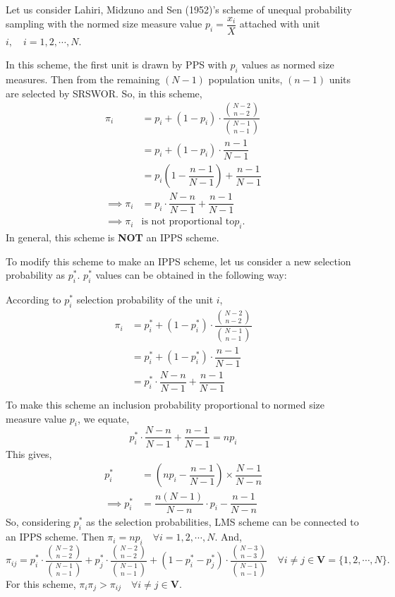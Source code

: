 \documentclass[12pt]{article}
\theoremstyle{definition}
\begin{document}
Let us consider Lahiri, Midzuno and Sen (1952)'s scheme of unequal probability sampling with the normed size measure value $p_i=\dfrac{x_i}{X}$ attached with unit $i, \quad i=1,2,\cdots ,N$.

In this scheme, the first unit is drawn by PPS with $p_i$ values as normed size measures. Then from the remaining $(N-1)$ population units, $(n-1)$ units are selected by SRSWOR. So, in this scheme,
\begin{align*}
    \pi_i & = p_i +(1-p_i)\cdot \dfrac{{N-2 \choose n-2}}{{N-1 \choose n-1}}\\
    & = p_i + (1-p_i)\cdot \dfrac{n-1}{N-1}\\
    & = p_i \left(1-\dfrac{n-1}{N-1}\right)+\dfrac{n-1}{N-1}\\
    \implies \pi_i & = p_i\cdot\dfrac{N-n}{N-1}+\dfrac{n-1}{N-1}\\
    \implies \pi_i & \text{is not proportional to} p_i.
\end{align*}
In general, this scheme is \textbf{NOT} an IPPS scheme.

To modify this scheme to make an IPPS scheme, let us consider a new selection probability as $p_i^*$. $p_i^*$ values can be obtained in the following way:

According to $p_i^*$ selection probability of the unit $i$, 
\begin{align*}
    \pi_i & = p_i^* +(1-p_i^*)\cdot \dfrac{{N-2 \choose n-2}}{{N-1 \choose n-1}}\\
    & = p_i^* + (1-p_i^*)\cdot \dfrac{n-1}{N-1}\\
    & = p_i^*\cdot\dfrac{N-n}{N-1}+\dfrac{n-1}{N-1}\\
\end{align*}
To make this scheme an inclusion probability proportional to normed size measure value $p_i$, we equate,
$$p_i^*\cdot\dfrac{N-n}{N-1}+\dfrac{n-1}{N-1}=np_i$$
This gives,
\begin{align*}
    p_i^* & = \left(np_i-\dfrac{n-1}{N-1} \right)\times\dfrac{N-1}{N-n}\\
    \implies p_i^*  & =\dfrac{n(N-1)}{N-n}\cdot p_i - \dfrac{n-1}{N-n}
\end{align*}
So, considering $p_i^*$ as the selection probabilities, LMS scheme can be connected to an IPPS scheme. Then $\pi_i=np_i \quad \forall i=1,2,\cdots , N$. And,
$$\pi_{ij}=p_i^*\cdot \dfrac{{N-2 \choose n-2}}{{N-1 \choose n-1}}+p_j^*\cdot \dfrac{{N-2 \choose n-2}}{{N-1 \choose n-1}}+(1-p_i^*-p_j^*)\cdot \dfrac{{N-3 \choose n-3}}{{N-1 \choose n-1}} \quad \forall i\neq j \in \mathbf{V} = \{1,2,\cdots,N\}.$$
For this scheme, $\pi_i\pi_j>\pi_{ij}\quad\forall i\neq j \in \mathbf{V}$.
\end{document}
